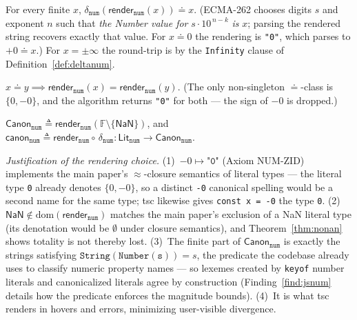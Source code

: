 \documentclass[11pt]{article}
\newcommand{\Lit}[1]{\mathsf{Lit}_{\texttt{#1}}}
\newcommand{\Canon}[1]{\mathsf{Canon}_{\texttt{#1}}}
\newcommand{\canon}{\mathsf{canon}}
\newcommand{\render}{\mathsf{render}}
\newcommand{\Fdb}{\mathbb{F}}
\newcommand{\zeq}{\doteq}   %
\begin{document}
\begin{axiom}
\label{ax:numrt}
For every finite $x$,
$\delta_{\texttt{num}}(\render_{\texttt{num}}(x)) \zeq x$. (ECMA-262
chooses digits $s$ and exponent $n$ such that \emph{the Number value for}
$s \cdot 10^{\,n-k}$ \emph{is} $x$; parsing the rendered string recovers
exactly that value. For $x \zeq 0$ the rendering is \texttt{"0"}, which
parses to $+0 \zeq x$.) For $x = \pm\infty$ the round-trip is by the
\texttt{Infinity} clause of Definition~\ref{def:deltanum}.
\end{axiom}

\begin{axiom}
\label{ax:numzid}
$x \zeq y \implies \render_{\texttt{num}}(x) = \render_{\texttt{num}}(y)$.
(The only non-singleton $\zeq$-class is $\{0,-0\}$, and the algorithm
returns \texttt{"0"} for both --- the sign of $-0$ is dropped.)
\end{axiom}

\begin{definition}[Canonical numeric lexemes; $\canon_{\texttt{num}}$]
\label{def:canonnum}
$\Canon{num} \triangleq
\render_{\texttt{num}}(\Fdb \setminus \{\mathsf{NaN}\})$, and
$\canon_{\texttt{num}} \triangleq
\render_{\texttt{num}} \circ\, \delta_{\texttt{num}} : \Lit{num} \to
\Canon{num}$.
\end{definition}

\emph{Justification of the rendering choice.}
(1)~$-0 \mapsto \texttt{"0"}$ (Axiom NUM-ZID) implements the main paper's
$\approx$-closure semantics of literal types --- the literal type
\texttt{0} already denotes $\{0,-0\}$, so a distinct \texttt{-0}
canonical spelling would be a second name for the same type; tsc likewise
gives \texttt{const x = -0} the type \texttt{0}.
(2)~$\mathsf{NaN} \notin \mathrm{dom}(\render_{\texttt{num}})$ matches
the main paper's exclusion of a NaN literal type (its denotation would be
$\emptyset$ under closure semantics), and Theorem~\ref{thm:nonan} shows
totality is not thereby lost.
(3)~The finite part of $\Canon{num}$ is exactly the strings satisfying
$\mathtt{String(Number(s))} = s$, the predicate the codebase already
uses to classify numeric property names --- so lexemes created by \texttt{keyof}
number literals and canonicalized literals agree by construction
(Finding~\ref{find:jsnum} details how the predicate enforces the
magnitude bounds).
(4)~It is what tsc renders in hovers and errors, minimizing user-visible
divergence.
\end{document}
